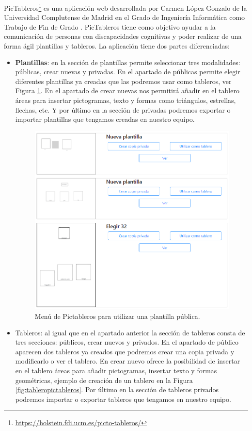 PicTableros\footnote{\url{https://holstein.fdi.ucm.es/picto-tableros/}} es una aplicación web desarrollada por Carmen López Gonzalo de la Universidad Complutense de Madrid en el Grado de Ingeniería Informática como Trabajo de Fin de Grado \citep{TFGPicTableros}. PicTableros tiene como objetivo ayudar a la comunicación de personas con discapacidades cognitivas y poder realizar de una forma ágil plantillas y tableros. 
La aplicación tiene dos partes diferenciadas:
\begin{itemize}
	\item \textbf{Plantillas}: en la sección de plantillas permite seleccionar tres modalidades: públicas, crear nuevas y privadas. En el apartado de públicas permite elegir diferentes plantillas ya creadas que las podremos usar como tableros, ver Figura \ref{fig:pictablerosplantilla}. 
	En el apartado de crear nuevas nos permitirá añadir en el tablero áreas para insertar pictogramas, texto y formas como triángulos, estrellas, flechas, etc. Y por último en la sección  de privadas podremos exportar o importar plantillas que tengamos creadas en nuestro equipo.
	
	\begin{figure}[h!]
		\centering
		\includegraphics[width=0.7\linewidth]{Imagenes/Bitmap/PictablerosPlantilla}
		\caption{Menú de Pictableros para utilizar una plantilla pública.}
		\label{fig:pictablerosplantilla}
	\end{figure}
	
	
	\item Tableros: al igual que en el apartado anterior la sección de tableros consta de tres secciones: públicos, crear nuevos y privados. En el apartado de público aparecen dos tableros ya creados que podremos crear una copia privada y modificarlo o ver el tablero. En crear nuevo ofrece la posibilidad de insertar en el tablero áreas para añadir pictogramas, insertar texto y formas geométricas, ejemplo de creación de un tablero en la Figura \ref{fig:tableropictableros}. Por último en la sección de tableros privados podremos importar o exportar tableros que tengamos en nuestro equipo.
	

\end{itemize}
